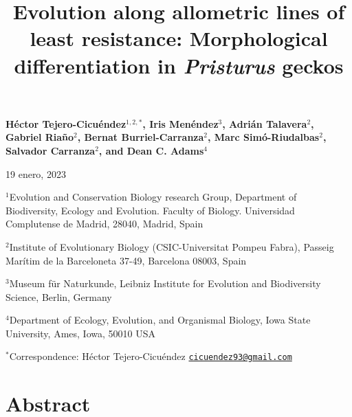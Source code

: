 \documentclass[
  11pt,
]{article}
\title{Evolution along allometric lines of least resistance: Morphological
differentiation in \emph{Pristurus} geckos}
\author{}
\date{\vspace{-2.5em}}
\begin{document}
\maketitle

\begin{center}
\textbf{H{\'{e}}ctor Tejero-Cicu{\'{e}}ndez$^{1,2,*}$,  Iris Men{\'{e}}ndez$^{3}$, Adri{\'{a}}n Talavera$^{2}$, Gabriel Riaño$^{2}$, Bernat Burriel-Carranza$^{2}$, Marc Sim{\'{o}}-Riudalbas$^{2}$, Salvador Carranza$^{2}$, and Dean C. Adams$^{4}$}
\end{center}

\begin{center}19 enero, 2023\end{center}

\(^{1}\)Evolution and Conservation Biology research Group, Department of
Biodiversity, Ecology and Evolution. Faculty of Biology. Universidad
Complutense de Madrid, 28040, Madrid, Spain

\(^{2}\)Institute of Evolutionary Biology (CSIC-Universitat Pompeu
Fabra), Passeig Marítim de la Barceloneta 37-49, Barcelona 08003, Spain

\(^{3}\)Museum für Naturkunde, Leibniz Institute for Evolution and
Biodiversity Science, Berlin, Germany

\(^{4}\)Department of Ecology, Evolution, and Organismal Biology, Iowa
State University, Ames, Iowa, 50010 USA

\(^{*}\)Correspondence: Héctor Tejero-Cicuéndez
\href{mailto:cicuendez93@gmail.com}{\nolinkurl{cicuendez93@gmail.com}}

\newpage

\hypertarget{abstract}{%
\section{Abstract}\label{abstract}}
\end{document}
